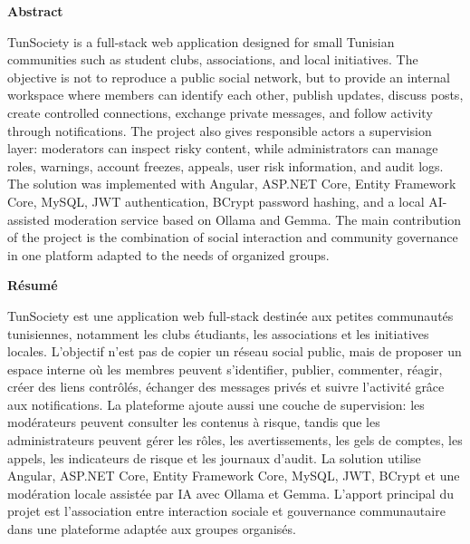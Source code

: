 \vspace{0.8cm}

\begin{center}
{\Large \textbf{Abstract}}
\end{center}

\noindent
TunSociety is a full-stack web application designed for small Tunisian communities such as student clubs, associations, and local initiatives. The objective is not to reproduce a public social network, but to provide an internal workspace where members can identify each other, publish updates, discuss posts, create controlled connections, exchange private messages, and follow activity through notifications. The project also gives responsible actors a supervision layer: moderators can inspect risky content, while administrators can manage roles, warnings, account freezes, appeals, user risk information, and audit logs. The solution was implemented with Angular, ASP.NET Core, Entity Framework Core, MySQL, JWT authentication, BCrypt password hashing, and a local AI-assisted moderation service based on Ollama and Gemma. The main contribution of the project is the combination of social interaction and community governance in one platform adapted to the needs of organized groups.

\vspace{0.6cm}

\begin{center}
{\Large \textbf{R\'esum\'e}}
\end{center}

\noindent
TunSociety est une application web full-stack destin\'ee aux petites communaut\'es tunisiennes, notamment les clubs \'etudiants, les associations et les initiatives locales. L'objectif n'est pas de copier un r\'eseau social public, mais de proposer un espace interne o\`u les membres peuvent s'identifier, publier, commenter, r\'eagir, cr\'eer des liens contr\^ol\'es, \'echanger des messages priv\'es et suivre l'activit\'e gr\^ace aux notifications. La plateforme ajoute aussi une couche de supervision: les mod\'erateurs peuvent consulter les contenus \`a risque, tandis que les administrateurs peuvent g\'erer les r\^oles, les avertissements, les gels de comptes, les appels, les indicateurs de risque et les journaux d'audit. La solution utilise Angular, ASP.NET Core, Entity Framework Core, MySQL, JWT, BCrypt et une mod\'eration locale assist\'ee par IA avec Ollama et Gemma. L'apport principal du projet est l'association entre interaction sociale et gouvernance communautaire dans une plateforme adapt\'ee aux groupes organis\'es.

